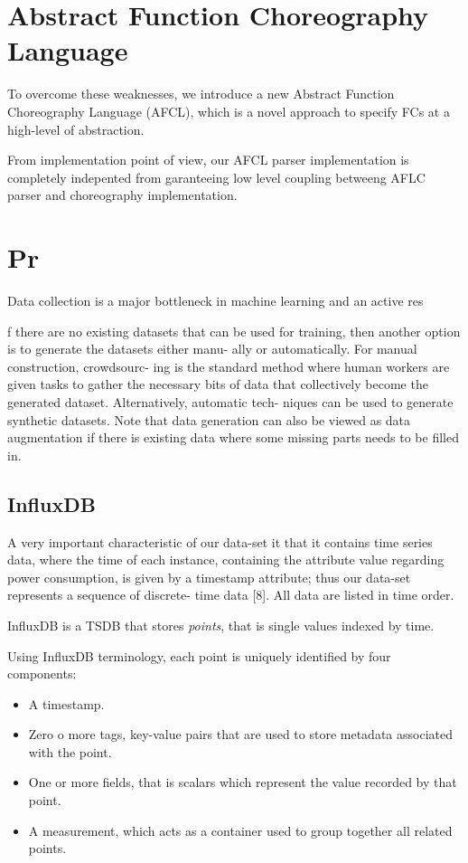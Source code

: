 \documentclass[12pt,a4paper]{report}
\theoremstyle{definition}
\begin{document}
\section{Abstract Function Choreography Language}

To overcome these weaknesses, we introduce a new Abstract
Function Choreography Language (AFCL), which is a novel approach
to specify FCs at a high-level of abstraction. 



From implementation point of view, our AFCL parser implementation is completely indepented from 
garanteeing low level coupling betweeng AFLC parser and choreography implementation.



\section{Pr}

Data collection is a major bottleneck in machine learning and an active res


f there are no existing datasets that can be used for training,
then another option is to generate the datasets either manu-
ally or automatically. For manual construction, crowdsourc-
ing is the standard method where human workers are given
tasks to gather the necessary bits of data that collectively
become the generated dataset. Alternatively, automatic tech-
niques can be used to generate synthetic datasets. Note that
data generation can also be viewed as data augmentation if
there is existing data where some missing parts needs to be
filled in.

\subsection{InfluxDB}

A very important characteristic of our data-set it that it contains time series data, where the time of each instance, containing the attribute value regarding power consumption, is given by a timestamp attribute; thus our data-set represents a sequence of discrete-
time data [8]. All data are listed in time order.


InfluxDB is a TSDB that stores \textit{points}, that is single values indexed by time. 

Using InfluxDB terminology, each point is uniquely identified by four components:

\begin{itemize}
	\item A timestamp.
	
	\item Zero o more tags, key-value pairs that are used to store metadata associated with the point. 
	 
	\item One or more fields, that is scalars which represent the value recorded by that point.
	
	\item A measurement, which acts as a container used to group together all related points.
	
\end{itemize}
\end{document}

